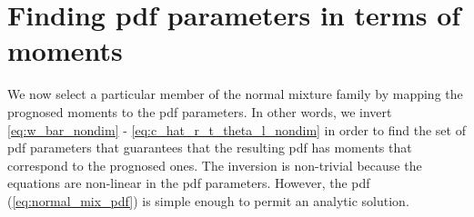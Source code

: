 \section{Finding pdf parameters in terms of moments}\label{sec:pdfparams}

We now select a particular member of the normal mixture family
by mapping the prognosed moments to the \gls{pdf} parameters.
In other words, we invert \cref{eq:w_bar_nondim} - \cref{eq:c_hat_r_t_theta_l_nondim}
in order to find the set of \gls{pdf} parameters
that guarantees that the resulting \gls{pdf} has moments that correspond to the prognosed ones.
The inversion is non-trivial because the equations are non-linear in the \gls{pdf} parameters.
However, the \gls{pdf} (\cref{eq:normal_mix_pdf}) is simple enough to permit an analytic solution.

